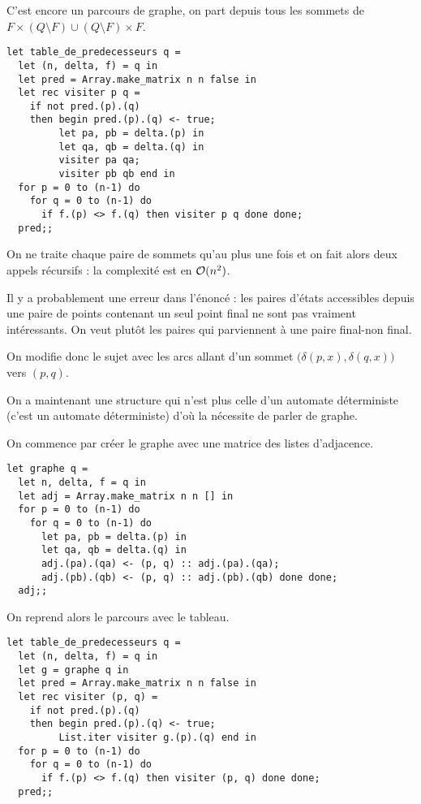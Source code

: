 \begin{Exercise}
C'est encore un parcours de graphe, on part depuis tous les sommets de $F\times (Q\setminus F) \cup (Q\setminus F) \times F$.
\begin{lstlisting}
let table_de_predecesseurs q =
  let (n, delta, f) = q in
  let pred = Array.make_matrix n n false in
  let rec visiter p q =
    if not pred.(p).(q)
    then begin pred.(p).(q) <- true;
         let pa, pb = delta.(p) in
         let qa, qb = delta.(q) in
         visiter pa qa;
         visiter pb qb end in
  for p = 0 to (n-1) do
    for q = 0 to (n-1) do
      if f.(p) <> f.(q) then visiter p q done done;
  pred;;
\end{lstlisting}
On ne traite chaque paire de sommets qu'au plus une fois et on fait alors deux appels récursifs : la complexité est en ${\cal O}(n^2)$.

\medskip

Il y a probablement une erreur dans l'énoncé : les paires d'états accessibles depuis une paire de points contenant un seul point final ne sont pas vraiment intéressants. On veut plutôt les paires qui parviennent à une paire final-non final.

On modifie donc le sujet avec les arcs allant d'un sommet $\bigl(\delta(p, x), \delta(q,x)\bigr)$ vers $(p, q)$.

On a maintenant une structure qui n'est plus celle d'un automate déterministe (c'est un automate déterministe) d'où la nécessite de parler de graphe.

On commence par créer le graphe avec une matrice des listes d'adjacence.

\begin{lstlisting}
let graphe q = 
  let n, delta, f = q in
  let adj = Array.make_matrix n n [] in
  for p = 0 to (n-1) do
    for q = 0 to (n-1) do
      let pa, pb = delta.(p) in
      let qa, qb = delta.(q) in
      adj.(pa).(qa) <- (p, q) :: adj.(pa).(qa);
      adj.(pb).(qb) <- (p, q) :: adj.(pb).(qb) done done;
  adj;;
\end{lstlisting}
 On reprend alors le parcours avec le tableau.
\begin{lstlisting}
let table_de_predecesseurs q =
  let (n, delta, f) = q in
  let g = graphe q in
  let pred = Array.make_matrix n n false in
  let rec visiter (p, q) =
    if not pred.(p).(q)
    then begin pred.(p).(q) <- true;
         List.iter visiter g.(p).(q) end in
  for p = 0 to (n-1) do
    for q = 0 to (n-1) do
      if f.(p) <> f.(q) then visiter (p, q) done done;
  pred;;
\end{lstlisting}
\end{Exercise}

